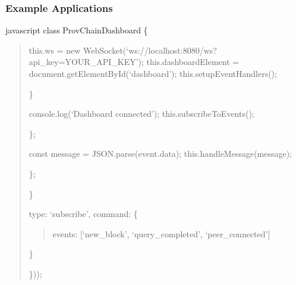 \documentclass[letterpaper,10pt,english]{sphinxmanual}
\begin{document}
\subsubsection{Example Applications}
\label{\detokenize{api/websocket-api:example-applications}}
\sphinxAtStartPar
{\color{red}\bfseries{}\textasciigrave{}\textasciigrave{}}{\color{red}\bfseries{}\textasciigrave{}}javascript
class ProvChainDashboard \{
\begin{quote}
\begin{description}
\sphinxAtStartPar
this.ws = new WebSocket(‘ws://localhost:8080/ws?api\_key=YOUR\_API\_KEY’);
this.dashboardElement = document.getElementById(‘dashboard’);
this.setupEventHandlers();

\end{description}

\sphinxAtStartPar
\}
\begin{description}
\begin{description}
\sphinxAtStartPar
console.log(‘Dashboard connected’);
this.subscribeToEvents();

\end{description}

\sphinxAtStartPar
\};
\begin{description}
\sphinxAtStartPar
const message = JSON.parse(event.data);
this.handleMessage(message);

\end{description}

\sphinxAtStartPar
\};

\end{description}

\sphinxAtStartPar
\}
\begin{description}
\begin{description}
\sphinxAtStartPar
type: ‘subscribe’,
command: \{
\begin{quote}

\sphinxAtStartPar
events: {[}‘new\_block’, ‘query\_completed’, ‘peer\_connected’{]}
\end{quote}

\sphinxAtStartPar
\}

\end{description}

\sphinxAtStartPar
\}));


\end{description}
\end{quote}
\end{document}
